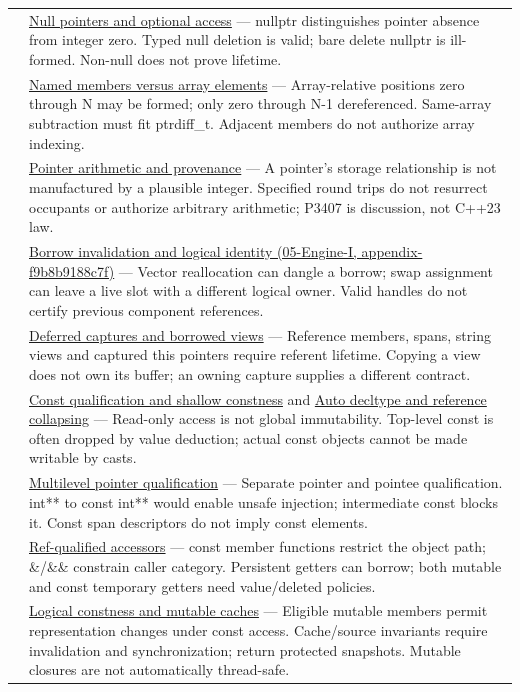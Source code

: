 {\begin{longtable}[]{@{}
  >{\raggedright\arraybackslash}p{}
  >{\raggedright\arraybackslash}p{}@{}}
118 & \hyperref[appendix-afae48c31800]{Null pointers and optional access} --- nullptr distinguishes pointer absence from integer zero. Typed null deletion is valid; bare delete nullptr is ill-formed. Non-null does not prove lifetime. \\
119 & \hyperref[appendix-3f7e15effba6]{Named members versus array elements} --- Array-relative positions zero through N may be formed; only zero through N-1 dereferenced. Same-array subtraction must fit ptrdiff\_t. Adjacent members do not authorize array indexing. \\
120 & \hyperref[appendix-6af5921bc853]{Pointer arithmetic and provenance} --- A pointer's storage relationship is not manufactured by a plausible integer. Specified round trips do not resurrect occupants or authorize arbitrary arithmetic; P3407 is discussion, not C++23 law. \\
121 & \href{../05-Engine-I/main.pdf\#nameddest=appendix-f9b8b9188c7f}{Borrow invalidation and logical identity (05-Engine-I, appendix-f9b8b9188c7f)} --- Vector reallocation can dangle a borrow; swap assignment can leave a live slot with a different logical owner. Valid handles do not certify previous component references. \\
122 & \hyperref[appendix-aea529eb5175]{Deferred captures and borrowed views} --- Reference members, spans, string views and captured this pointers require referent lifetime. Copying a view does not own its buffer; an owning capture supplies a different contract. \\
123 & \hyperref[appendix-c25d60fed375]{Const qualification and shallow constness} and \hyperref[appendix-5d4252a42886]{Auto decltype and reference collapsing} --- Read-only access is not global immutability. Top-level const is often dropped by value deduction; actual const objects cannot be made writable by casts. \\
124 & \hyperref[appendix-5e1a7561cd98]{Multilevel pointer qualification} --- Separate pointer and pointee qualification. int** to const int** would enable unsafe injection; intermediate const blocks it. Const span descriptors do not imply const elements. \\
125 & \hyperref[appendix-d42039b1d6f7]{Ref-qualified accessors} --- const member functions restrict the object path; \&/\&\& constrain caller category. Persistent getters can borrow; both mutable and const temporary getters need value/deleted policies. \\
126 & \hyperref[appendix-f5593256bcaf]{Logical constness and mutable caches} --- Eligible mutable members permit representation changes under const access. Cache/source invariants require invalidation and synchronization; return protected snapshots. Mutable closures are not automatically thread-safe. \\
\end{longtable}
}

